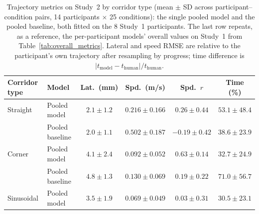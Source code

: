 \begin{table}[t]
    \caption{Trajectory metrics on Study~2 by corridor type (mean $\pm$ SD
    across participant--condition pairs, 14 participants $\times$ 25
    conditions): the single pooled model and the pooled baseline, both
    fitted on the 8 Study~1 participants. The last row repeats, as a
    reference, the per-participant models' overall values on Study~1 from
    Table~\ref{tab:overall_metrics}. Lateral and speed RMSE are relative to
    the participant's own trajectory after resampling by progress; time
    difference is $|t_{\mathrm{model}} - t_{\mathrm{human}}| / t_{\mathrm{human}}$.}
    \label{tab:study2_metrics}
    \small
    \setlength{\tabcolsep}{4pt}
    \begin{tabular}{l l cccc}
        \toprule
        Corridor type & Model & Lat.\ (mm) & Spd.\ (m/s) & Spd.\ $r$ & Time (\%) \\
        \midrule
        Straight           & Pooled model               & $2.1 \pm 1.2$ & $0.216 \pm 0.166$ & $0.26 \pm 0.44$ & $53.1 \pm 48.4$ \\
                           & Pooled baseline            & $2.0 \pm 1.1$ & $0.502 \pm 0.187$ & $-0.19 \pm 0.42$ & $38.6 \pm 23.9$ \\
        Corner             & Pooled model               & $4.1 \pm 2.4$ & $0.092 \pm 0.052$ & $0.63 \pm 0.14$ & $32.7 \pm 24.9$ \\
                           & Pooled baseline            & $4.8 \pm 1.3$ & $0.130 \pm 0.069$ & $0.19 \pm 0.22$ & $71.0 \pm 56.7$ \\
        Sinusoidal         & Pooled model               & $3.5 \pm 1.9$ & $0.069 \pm 0.049$ & $0.03 \pm 0.31$ & $30.5 \pm 23.1$ \\

\end{tabular}
\end{table}
